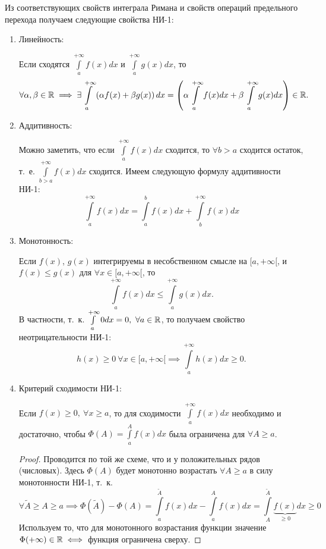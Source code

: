 \documentclass[../../main.tex]{subfiles}
\begin{document}
Из соответствующих свойств интеграла Римана и свойств операций предельного
перехода получаем следующие свойства НИ-1:
\begin{enumerate}
        \item Линейность:
        
        Если сходятся $\displaystyle\int\limits_a^{+\infty} f(x)dx$ и
        $\displaystyle\int\limits_a^{+\infty} g(x)dx$, то \[\forall \alpha, 
        \beta \in \mathbb{R}
        \implies  \exists \int\limits_a^{+\infty} \left( \alpha f(x)
        + \beta g(x) \right)dx = \left( \alpha \int\limits_a^{+\infty}
        f(x)dx + \beta \int\limits_a^{+\infty} g(x)dx \right) \in \mathbb{R}.\]
        \item Аддитивность:
        
        Можно заметить, что если $\displaystyle\int\limits_a^{+\infty} f(x)dx$ 
        сходится, то
        $\forall b>a$ сходится остаток, т.~е.
        $\displaystyle\int\limits_{b>a}^{+\infty} f(x)dx$ сходится. Имеем 
        следующую формулу
        аддитивности НИ-1:
        \[\int\limits_a^{+\infty} f(x)dx = \int\limits_a^b f(x)dx +
        \int\limits_b^{+\infty} f(x)dx \]
        \item Монотонность:
        
        Если $f(x)$, $g(x)$ интегрируемы в несобственном смысле на
        $[a, +\infty[$,
        и $f(x) \leq g(x)$ для ${\forall x \in [a, +\infty[}$, то
        \[\int\limits_a^{+\infty} f(x)dx \leq \int\limits_a^{+\infty} g(x)dx.\]
        В частности, т.~к. $\int\limits_a^{+\infty} 0dx = 0, \ \forall a \in 
        \mathbb{R}$, то получаем свойство неотрицательности НИ-1: \[h(x) \geq 0 \ 
        \forall x \in
        [a, +\infty[ \implies \int\limits_a^{+\infty} h(x)dx \geq 0.\]
        \item Критерий сходимости НИ-1:
        
        Если $f(x) \geq 0, \ \forall x \geq a$, то для сходимости
        $ \int\limits_a^{+\infty} f(x)dx$ необходимо и достаточно, чтобы 
        $\Phi(A) =
        \int\limits_a^{A} f(x)dx$ была ограничена для $\forall A \geq a$.
        \begin{proof}
            Проводится по той же схеме, что и у положительных рядов (числовых).
            Здесь $\Phi(A)$ будет монотонно возрастать $\forall A \geq a$
            в силу монотонности НИ-1, т.~к.
            \[\forall \tilde{A} \geq A \geq a
            \implies \Phi(\tilde{A}) - \Phi(A) =
            \int\limits_a^{\tilde{A}} f(x)dx - \int\limits_a^{A} f(x)dx =
            \int\limits_A^{\tilde{A}} \underbrace{f(x)}_{\geq 0} dx \geq 0 \]
            Используем то, что для монотонного возрастания функции значение
            $\Phi (+\infty) \in \mathbb{R} \iff$ функция ограничена сверху.
        \end{proof}
\end{enumerate}
\end{document}
